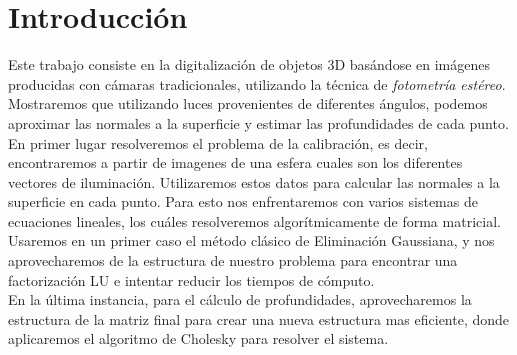 \section{Introducción}


Este trabajo consiste en la digitalización de objetos 3D basándose en imágenes producidas con cámaras tradicionales, utilizando la técnica de \textit{fotometría estéreo}. Mostraremos que utilizando luces provenientes de diferentes ángulos, podemos aproximar las normales a la superficie y estimar las profundidades de cada punto. \\

En primer lugar resolveremos el problema de la calibración, es decir, encontraremos a partir de imagenes de una esfera cuales son los diferentes vectores de iluminación. Utilizaremos estos datos para calcular las normales a la superficie en cada punto. Para esto nos enfrentaremos con varios sistemas de ecuaciones lineales, los cuáles resolveremos algorítmicamente de forma matricial. Usaremos en un primer caso el método clásico de Eliminación Gaussiana, y nos aprovecharemos de la estructura de nuestro problema para encontrar una factorización LU e intentar reducir los tiempos de cómputo. \\

En la última instancia, para el cálculo de profundidades, aprovecharemos la estructura de la matriz final para crear una nueva estructura mas eficiente, donde aplicaremos el algoritmo de Cholesky para resolver el sistema. \\

